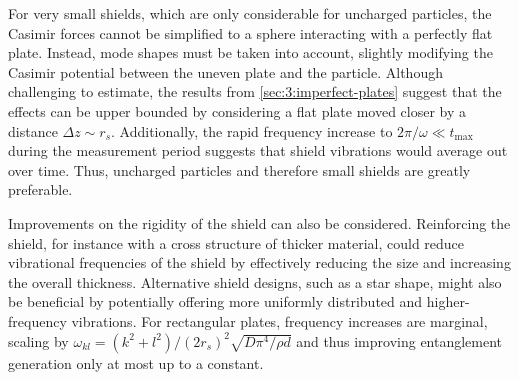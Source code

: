 For very small shields, which are only considerable for uncharged particles, the Casimir forces cannot be simplified to a sphere interacting with a perfectly flat plate.
Instead, mode shapes must be taken into account, slightly modifying the Casimir potential between the uneven plate and the particle.
Although challenging to estimate, the results from \cref{sec:3:imperfect-plates} suggest that the effects can be upper bounded by considering a flat plate moved closer by a distance $\Delta z \sim r_s$.
Additionally, the rapid frequency increase to $2\pi/\omega \ll t_\mathrm{max}$ during the measurement period suggests that shield vibrations would average out over time.
Thus, uncharged particles and therefore small shields are greatly preferable.

Improvements on the rigidity of the shield can also be considered. 
Reinforcing the shield, for instance with a cross structure of thicker material, could reduce vibrational frequencies of the shield by effectively reducing the size and increasing the overall thickness.
Alternative shield designs, such as a star shape, might also be beneficial by potentially offering more uniformly distributed and higher-frequency vibrations. For rectangular plates, frequency increases are marginal, scaling by $\omega_{kl} = (k^2 + l^2)/(2r_s)^2 \sqrt{D \pi^4 / \rho d}$ \cite[p. 471-474]{Rao_2019} and thus improving entanglement generation only at most up to a constant.